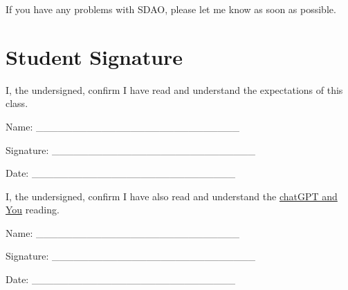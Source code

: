 \documentclass[12pt]{article}
\begin{document}
If you have any problems with SDAO, please let me know as soon as possible.

\section{Student Signature}

I, the undersigned, confirm I have read and understand the expectations of this class.
\\
\vspace{1cm}

Name: \_\_\_\_\_\_\_\_\_\_\_\_\_\_\_\_\_\_\_\_\_\_\_\_\_\_\_\_
\\
\vspace{1cm}

Signature: \_\_\_\_\_\_\_\_\_\_\_\_\_\_\_\_\_\_\_\_\_\_\_\_\_\_\_\_
\\
\vspace{1cm}

Date: \_\_\_\_\_\_\_\_\_\_\_\_\_\_\_\_\_\_\_\_\_\_\_\_\_\_\_\_

\vspace{2cm}


I, the undersigned, confirm I have also read and understand the \href{https://nickeubank.github.io/practicaldatascience_book/notebooks/PDS_not_yet_in_coursera/99_advice/llms.html}{chatGPT and You} reading.
\\
\vspace{1cm}

Name: \_\_\_\_\_\_\_\_\_\_\_\_\_\_\_\_\_\_\_\_\_\_\_\_\_\_\_\_
\\
\vspace{1cm}

Signature: \_\_\_\_\_\_\_\_\_\_\_\_\_\_\_\_\_\_\_\_\_\_\_\_\_\_\_\_
\\
\vspace{1cm}

Date: \_\_\_\_\_\_\_\_\_\_\_\_\_\_\_\_\_\_\_\_\_\_\_\_\_\_\_\_
\end{document}
